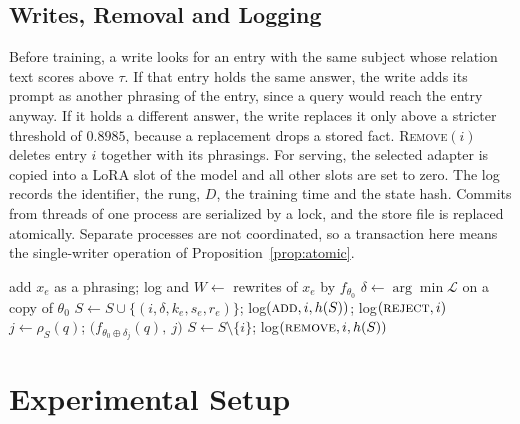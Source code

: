 \documentclass[journal,10pt]{IEEEtran}
\newcommand{\revoke}{\textsc{Remove}}
\begin{document}
\subsection{Writes, Removal and Logging}
Before training, a write looks for an entry with the same subject whose relation text scores above $\tau$.
If that entry holds the same answer, the write adds its prompt as another phrasing of the entry, since a
query would reach the entry anyway. If it holds a different answer, the write replaces it only above a
stricter threshold of $0.8985$, because a replacement drops a stored fact. \revoke$(i)$ deletes entry $i$
together with its phrasings. For serving, the selected adapter is copied into a LoRA slot of the model and
all other slots are set to zero. The log records the identifier, the rung, $D$, the training time and the
state hash. Commits from threads of one process are serialized by a lock, and the store file is replaced
atomically. Separate processes are not coordinated, so a transaction here means the single-writer operation
of Proposition~\ref{prop:atomic}.

\begin{algorithm}[t]
\caption{Operations on the store}
\label{alg:txn}
\begin{algorithmic}[1]
   \State add $x_e$ as a phrasing; log and \Return \EndIf
  \State $W\gets$ rewrites of $x_e$ by $f_{\theta_0}$
    \State $\delta\gets\arg\min\mathcal{L}$ on a copy of $\theta_0$ 
      \State $S\gets S\cup\{(i,\delta,k_e,s_e,r_e)\}$; log$(\textsc{add},i,h(S))$; \Return
    \EndIf
  \EndFor
  \State log$(\textsc{reject},i)$ 
\EndFunction
{}
  \State $j\gets\rho_S(q)$; \Return $\big(f_{\theta_0\oplus\delta_j}(q),\ j\big)$ 
\EndFunction
{}
  \State $S\gets S\setminus\{i\}$; log$(\textsc{remove},i,h(S))$
\EndFunction
\end{algorithmic}
\end{algorithm}

\section{Experimental Setup}
\label{sec:setup}
\end{document}
